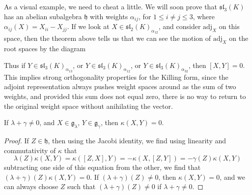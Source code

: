 As a visual example, we need to cheat a little. We will soon prove that $\mathfrak{sl}_3(K)$ has an abelian subalgebra $\mathfrak{h}$ with weights $\alpha_{ij}$, for $1 \leq i \neq j \leq 3$, where $\alpha_{ij}(X) = X_{ii} - X_{jj}$. If we look at $X \in \mathfrak{sl}_2(K)_{\alpha_{12}}$, and consider $\text{adj}_X$ on this space,  then the theorem above tells us that we can see the motion of $\text{adj}_X$ on the root spaces by the diagram
%
\begin{center}
\end{center}
%
Thus if $Y \in \mathfrak{sl}_3(K)_{\alpha_{13}}$, or $Y \in \mathfrak{sl}_3(K)_{\alpha_{12}}$, or $Y \in \mathfrak{sl}_3(K)_{\alpha_{32}}$, then $[X,Y] = 0$. This implies strong orthogonality properties for the Killing form, since the adjoint representation always pushes weight spaces around as the sum of two weights, and provided this sum does not equal zero, there is no way to return to the original weight space without anihilating the vector.

\begin{theorem}
    If $\lambda + \gamma \neq 0$, and $X \in \mathfrak{g}_\lambda$, $Y \in \mathfrak{g}_\gamma$, then $\kappa(X,Y) = 0$.
\end{theorem}
\begin{proof}
    If $Z \in \mathfrak{h}$, then using the Jacobi identity, we find using linearity and commutativity of $\kappa$ that
    \[ \lambda(Z) \kappa(X,Y) = \kappa([Z,X],Y) = -\kappa(X,[Z,Y]) = - \gamma(Z) \kappa(X,Y) \]
    subtracting one side of this equation from the other, we find that $(\lambda + \gamma)(Z) \kappa(X,Y) = 0$. If $(\lambda + \gamma)(Z) \neq 0$, then $\kappa(X,Y) = 0$, and we can always choose $Z$ such that $(\lambda + \gamma)(Z) \neq 0$ if $\lambda + \gamma \neq 0$.
\end{proof}


